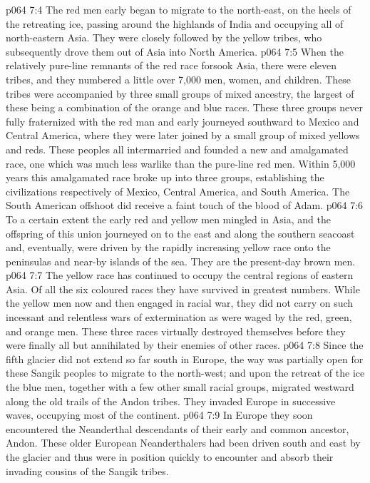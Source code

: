 \vs p064 7:4 The red men early began to migrate to the north\hyp{}east, on the heels of the retreating ice, passing around the highlands of India and occupying all of north\hyp{}eastern Asia. They were closely followed by the yellow tribes, who subsequently drove them out of Asia into North America.
\vs p064 7:5 When the relatively pure\hyp{}line remnants of the red race forsook Asia, there were eleven tribes, and they numbered a little over 7,000 men, women, and children. These tribes were accompanied by three small groups of mixed ancestry, the largest of these being a combination of the orange and blue races. These three groups never fully fraternized with the red man and early journeyed southward to Mexico and Central America, where they were later joined by a small group of mixed yellows and reds. These peoples all intermarried and founded a new and amalgamated race, one which was much less warlike than the pure\hyp{}line red men. Within 5,000 years this amalgamated race broke up into three groups, establishing the civilizations respectively of Mexico, Central America, and South America. The South American offshoot did receive a faint touch of the blood of Adam.
\vs p064 7:6 To a certain extent the early red and yellow men mingled in Asia, and the offspring of this union journeyed on to the east and along the southern seacoast and, eventually, were driven by the rapidly increasing yellow race onto the peninsulas and near\hyp{}by islands of the sea. They are the present\hyp{}day brown men.
\vs p064 7:7 The yellow race has continued to occupy the central regions of eastern Asia. Of all the six coloured races they have survived in greatest numbers. While the yellow men now and then engaged in racial war, they did not carry on such incessant and relentless wars of extermination as were waged by the red, green, and orange men. These three races virtually destroyed themselves before they were finally all but annihilated by their enemies of other races.
\vs p064 7:8 Since the fifth glacier did not extend so far south in Europe, the way was partially open for these Sangik peoples to migrate to the north\hyp{}west; and upon the retreat of the ice the blue men, together with a few other small racial groups, migrated westward along the old trails of the Andon tribes. They invaded Europe in successive waves, occupying most of the continent.
\vs p064 7:9 In Europe they soon encountered the Neanderthal descendants of their early and common ancestor, Andon. These older European Neanderthalers had been driven south and east by the glacier and thus were in position quickly to encounter and absorb their invading cousins of the Sangik tribes.
